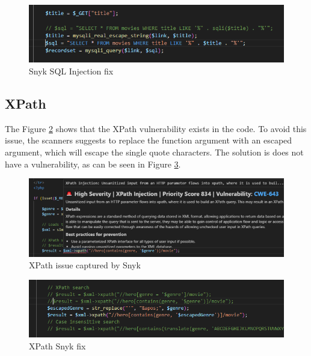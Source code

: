 \documentclass{article}
\begin{document}
\begin{figure}[H]
    \centering
    \includegraphics[width=0.5\linewidth]{Figures/defensive/sql-injection-fix.PNG}
    \caption{Snyk SQL Injection fix}
    \label{fig:snyk-sql-injection-fix}
\end{figure}
\subsection{XPath}
\par The Figure \ref{fig:snyk-xpath-issue} shows that the XPath vulnerability exists in the code. To avoid this issue, the scanners suggests to replace the function argument with an escaped argument, which will escape the single quote characters. The solution is does not have a vulnerability, as can be seen in Figure \ref{fig:xpath-snyk-fix}.
\begin{figure}[H]
    \centering
    \includegraphics[width=0.5\linewidth]{Figures/defensive/xpath-issue-snyk.PNG}
    \caption{XPath issue captured by Snyk}
    \label{fig:snyk-xpath-issue}
\end{figure}
\begin{figure}[H]
    \centering
    \includegraphics[width=0.5\linewidth]{Figures/defensive/xpath-snyk-fix.PNG}
    \caption{XPath Snyk fix}
    \label{fig:xpath-snyk-fix}
\end{figure}
\end{document}
